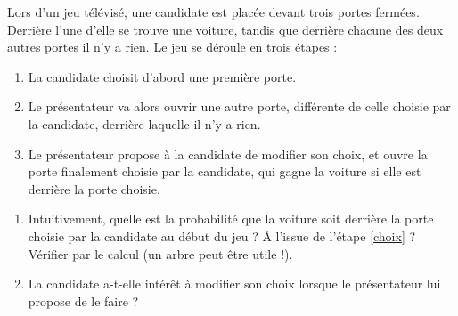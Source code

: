 \documentclass[11pt]{article}
\begin{document}
\begin{exo}
Lors d'un jeu télévisé, une
candidate est placée devant trois portes fermées. Derrière l'une d'elle se trouve
une voiture, tandis que derrière chacune des deux autres portes il n'y a rien.
Le jeu se déroule en trois étapes :
\begin{enumerate}[label=(\alph*)]
  \item La candidate choisit d'abord une première porte.
  \item\label{choix} Le présentateur va alors ouvrir une autre porte, différente de celle
    choisie par la candidate, derrière laquelle il n'y a rien.
  \item Le présentateur propose à la candidate de modifier son choix, et ouvre
    la porte finalement choisie par la candidate, qui gagne la voiture si elle
    est derrière la porte choisie.
\end{enumerate}
\begin{enumerate}
  \item Intuitivement, quelle est la probabilité que la voiture soit derrière la
    porte choisie par la candidate au début du jeu ? À l'issue de l'étape
    \ref{choix} ? Vérifier par le calcul (un arbre peut être utile !).
  \item La candidate a-t-elle intérêt à modifier son choix lorsque le présentateur lui
propose de le faire ?
\end{enumerate}
\end{exo}
\end{document}
